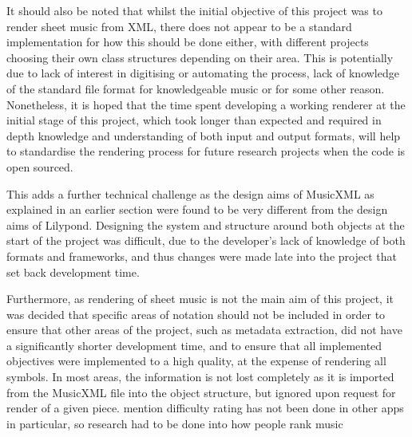 It should also be noted that whilst the initial objective of this project was to render sheet music from XML, there does not appear to be a standard implementation for how this should be done either, with different projects choosing their own class structures depending on their area\parencite{Music21}. This is potentially due to lack of interest in digitising or automating the process, lack of knowledge of the standard file format for knowledgeable music or for some other reason. Nonetheless, it is hoped that the time spent developing a working renderer at the initial stage of this project, which took longer than expected and required in depth knowledge and understanding of both input and output formats, will help to standardise the rendering process for future research projects when the code is open sourced.

This adds a further technical challenge as the design aims of MusicXML as explained in an earlier section were found to be very different from the design aims of Lilypond. Designing the system and structure around both objects at the start of the project was difficult, due to the developer's lack of knowledge of both formats and frameworks, and thus changes were made late into the project that set back development time.

Furthermore, as rendering of sheet music is not the main aim of this project, it was decided that specific areas of notation should not be included in order to ensure that other areas of the project, such as metadata extraction, did not have a significantly shorter development time, and to ensure that all implemented objectives were implemented to a high quality, at the expense of rendering all symbols. In most areas, the information is not lost completely as it is imported from the MusicXML file into the object structure, but ignored upon request for render of a given piece.
mention difficulty rating has not been done in other apps in particular, so research had to be done into how people rank music
